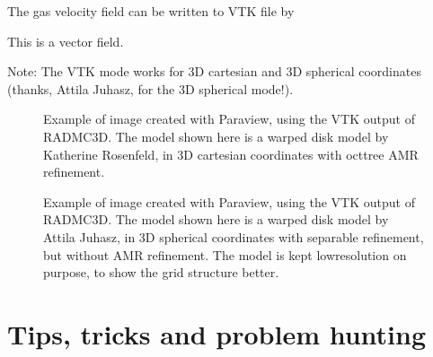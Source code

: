 \documentclass[letterpaper,10pt,english]{sphinxmanual}
\begin{document}
The gas velocity field can be written to VTK file by

\begin{sphinxVerbatim}[commandchars=\\\{\}]
 
\end{sphinxVerbatim}

This is a vector field.

Note: The VTK mode works for 3\sphinxhyphen{}D cartesian and 3\sphinxhyphen{}D spherical coordinates
(thanks, Attila Juhasz, for the 3\sphinxhyphen{}D spherical mode!).

\begin{figure}[htbp]
\centering
\capstart

\noindent{}
\caption{Example of image created with Paraview, using the VTK output of RADMC\sphinxhyphen{}3D.
The model shown here is a warped disk model by Katherine Rosenfeld, in 3\sphinxhyphen{}D
cartesian coordinates with oct\sphinxhyphen{}tree AMR refinement.}\label{\detokenize{vtkoutput:id1}}\label{\detokenize{vtkoutput:fig-disk-with-vtk}}\end{figure}

\begin{figure}[htbp]
\centering
\capstart

\noindent{}
\caption{Example of image created with Paraview, using the VTK output of RADMC\sphinxhyphen{}3D.
The model shown here is a warped disk model by Attila Juhasz, in 3\sphinxhyphen{}D
spherical coordinates with separable refinement, but without AMR refinement.
The model is kept low\sphinxhyphen{}resolution on purpose, to show the grid structure
better.}\label{\detokenize{vtkoutput:id2}}\label{\detokenize{vtkoutput:fig-modeljuhasz-with-vtk}}\end{figure}


\chapter{Tips, tricks and problem hunting}
\label{\detokenize{tipsandtricks:tips-tricks-and-problem-hunting}}\label{\detokenize{tipsandtricks:chap-problem-hunting}}\label{\detokenize{tipsandtricks::doc}}
\end{document}
